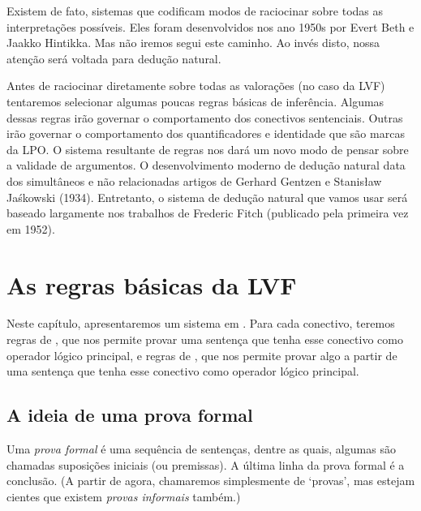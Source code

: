 Existem de fato, sistemas que  codificam modos de raciocinar sobre todas as interpreta\c c\~oes poss\'iveis. Eles foram desenvolvidos nos ano 1950s por Evert Beth e  Jaakko Hintikka.  Mas n\~ao iremos segui este caminho.  Ao inv\'es disto,  nossa aten\c c\~ao ser\'a voltada para dedu\c c\~ao natural. 
 
Antes de raciocinar diretamente sobre todas as valora\c c\~oes  (no caso da LVF) tentaremos selecionar algumas poucas regras b\'asicas de infer\^encia.  Algumas dessas regras  ir\~ao governar o comportamento dos conectivos sentenciais. Outras ir\~ao governar o comportamento dos quantificadores e identidade que s\~ao marcas da LPO.  
O sistema resultante de regras nos dar\'a um novo modo de pensar sobre a validade de argumentos.  O desenvolvimento moderno de dedu\c c\~ao  natural data dos simult\^aneos  e n\~ao relacionadas artigos de  
 Gerhard Gentzen e Stanis\l{}aw Ja\'{s}kowski (1934).  Entretanto, o sistema de dedu\c c\~ao natural que vamos usar  ser\'a  baseado largamente nos trabalhos de Frederic Fitch (publicado pela primeira vez em 1952). 

\chapter{As regras b\'asicas da LVF}\label{s:BasicTFL}

 

Neste cap\'itulo,  apresentaremos um sistema em  . Para cada conectivo, teremos regras de  ,  que nos permite provar uma senten\c ca que tenha esse conectivo como operador l\'ogico principal, e regras de , que nos permite provar  algo a partir de  uma senten\c ca que tenha esse  conectivo como operador l\'ogico principal. 


\section{A  ideia de uma prova formal}
Uma \emph{prova formal} \'e uma sequ\^encia de senten\c cas,  dentre as quais, algumas s\~ao  chamadas suposi\c c\~oes iniciais (ou premissas).  A \'ultima linha da prova formal \'e a conclus\~ao.  (A partir de agora, chamaremos simplesmente de `provas',  mas estejam cientes que existem \emph{provas informais} tamb\'em.)

